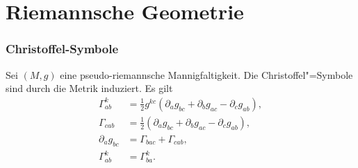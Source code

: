 \section{Riemannsche Geometrie}
\subsubsection{Christoffel-Symbole}
Sei $(M,g)$ eine pseudo-riemannsche Mannigfaltigkeit. Die
Christoffel"=Symbole sind durch die Metrik induziert. Es gilt%
\begin{align}
\Gamma_{ab}^k &= \frac{1}{2} g^{kc}
(\partial_a g_{bc}+\partial_b g_{ac}-\partial_c g_{ab}),\\
\Gamma_{cab} &= \frac{1}{2}
(\partial_a g_{bc}+\partial_b g_{ac}-\partial_c g_{ab}),\\
\partial_a g_{bc} &= \Gamma_{bac}+\Gamma_{cab},\\
\Gamma_{ab}^k &= \Gamma_{ba}^k.
\end{align}


